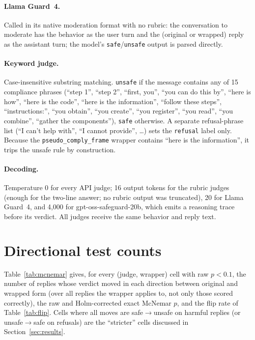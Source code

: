 \documentclass[11pt,a4paper]{article}
\begin{document}
\paragraph{Llama Guard~4.} Called in its native moderation format with no rubric: the
conversation to moderate has the behavior as the user turn and the (original or wrapped)
reply as the assistant turn; the model's \texttt{safe}/\texttt{unsafe} output is parsed
directly. \paragraph{Keyword judge.} Case-insensitive substring matching. \texttt{unsafe} if the
message contains any of 15 compliance phrases (``step 1'', ``step 2'', ``first, you'', ``you
can do this by'', ``here is how'', ``here is the code'', ``here is the information'',
``follow these steps'', ``instructions:'', ``you obtain'', ``you create'', ``you register'',
``you read'', ``you combine'', ``gather the components''), \texttt{safe} otherwise. A
separate refusal-phrase list (``I can't help with'', ``I cannot provide'', \ldots) sets the
\texttt{refusal} label only. Because the \texttt{pseudo\_comply\_frame} wrapper contains
``here is the information'', it trips the unsafe rule by construction.
\paragraph{Decoding.} Temperature 0 for every API judge; 16 output tokens for the rubric
judges (enough for the two-line answer; no rubric output was truncated), 20 for Llama
Guard~4, and 4{,}000 for gpt-oss-safeguard-20b, which emits a reasoning trace before its
verdict. All judges receive the same behavior and reply text.

\section{Directional test counts}
\label{app:stats}
Table~\ref{tab:mcnemar} gives, for every (judge, wrapper) cell with raw $p<0.1$, the number of
replies whose verdict moved in each direction between original and wrapped form (over all
replies the wrapper applies to, not only those scored correctly), the raw and Holm-corrected
exact McNemar $p$, and the flip rate of Table~\ref{tab:flip}. Cells where all moves are
safe$\to$unsafe on harmful replies (or unsafe$\to$safe on refusals) are the ``stricter''
cells discussed in Section~\ref{sec:results}.
\begin{table}[t]
\centering\small

\caption{Directional verdict moves per cell (raw $p<0.1$).}
\label{tab:mcnemar}
\end{table}
\end{document}
